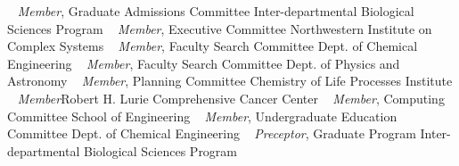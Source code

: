~
\Gap
{}
\textit{Member},
    Graduate Admissions Committee
    \newline
Inter-departmental Biological Sciences Program
\newline
~
\Gap
{}
\textit{Member},
    Executive Committee
    \newline
Northwestern Institute on Complex Systems
\newline
~
\Gap
{}
\textit{Member},
    Faculty Search Committee
    \newline
Dept. of Chemical Engineering
\newline
~
\Gap
{}
\textit{Member},
    Faculty Search Committee
    \newline
Dept. of Physics and Astronomy
\newline
~
\Gap
{}
\textit{Member},
    Planning Committee
    \newline
Chemistry of Life Processes Institute
\newline
~
\Gap
{}
\textit{Member}Robert H. Lurie Comprehensive Cancer Center
\newline
~
\Gap
{}
\textit{Member},
    Computing Committee
    \newline
School of Engineering
\newline
~
\Gap
{}
\textit{Member},
    Undergraduate Education Committee
    \newline
Dept. of Chemical Engineering
\newline
~
\Gap
{}
\textit{Preceptor},
    Graduate Program
    \newline
Inter-departmental Biological Sciences Program
\newline
~
\Gap
\vspace*{0.2cm}